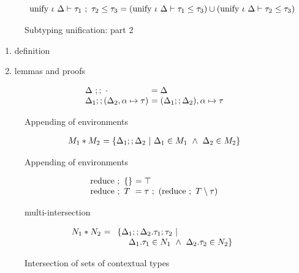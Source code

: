\documentclass[sigplan,screen]{acmart}
\begin{document}
\begin{figure*}[h]
\[\begin{array}{l @{} l}
      \\
      \text{unify } \iota\ \Delta \vdash
      \tau_1\ ;\ \tau_2 \leq \tau_3
      &{} = 
      (\text{unify } \iota\ \Delta \vdash \tau_1 \leq \tau_3)
      \cup
      (\text{unify } \iota\ \Delta \vdash \tau_2 \leq \tau_3)

    \end{array}
  \]
  \caption{Subtyping unification: part 2}
\end{figure*}
\begin{enumerate}
  \item definition 
  \item lemmas and proofs 
\end{enumerate}

\begin{figure}[h]
  \[
    \begin{array}{l @{} l}
    \Delta\ ;;\ \cdot
    &\ = \Delta 
    \\
    \Delta_1;;(\Delta_2,\alpha \mapsto \tau) 
    &\ = (\Delta_1;;\Delta_2),\alpha \mapsto \tau
    \end{array}
  \]

  \caption{Appending of environments}
\end{figure}

\begin{figure}[h]
  \[
    \begin{array}{l @{} l}
    M_1 * M_2 
    &\ = 
    \{ \Delta_1 ;; \Delta_2 \ |\ 
      \Delta_1 \in M_1
      \ \wedge\ 
      \Delta_2 \in M_2
    \}
    \end{array}
  \]

  \caption{Appending of environments}
\end{figure}

\begin{figure}[h]
  \[
    \begin{array}{l @{} l}
    \text{reduce } ;\ \{ \} 
    &\ = \top
    \\
    \text{reduce } ;\ T
    &\ = \tau\ ;\ (\text{reduce } ;\ T \setminus \tau)
    \end{array}
  \]

  \caption{multi-intersection}
\end{figure}

\begin{figure}[h]
  \[
    \begin{array}{l @{} l}
      N_1 * N_2
      &\ = 
      \begin{array}[t]{l}
        \{ \Delta_1 ;; \Delta_2 . \tau_1;\tau_2 \ |\ 
          \\
          \ \ \ \ \Delta_1.\tau_1 \in N_1
          \ \wedge\ 
          \Delta_2.\tau_2 \in N_2
        \}
      \end{array}
    \end{array}
  \]

  \caption{Intersection of sets of contextual types}
\end{figure}
\end{document}
